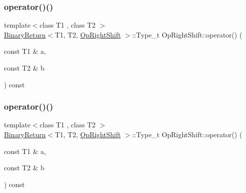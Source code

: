 \subsubsection{\texorpdfstring{operator()()}{operator()()}\hspace{0.1cm}{\footnotesize\ttfamily [1/3]}}
{\footnotesize\ttfamily template$<$class T1 , class T2 $>$ \\
\mbox{\hyperlink{structBinaryReturn}{Binary\+Return}}$<$T1, T2, \mbox{\hyperlink{structOpRightShift}{Op\+Right\+Shift}} $>$\+::Type\+\_\+t Op\+Right\+Shift\+::operator() (\begin{DoxyParamCaption}\item[{const T1 \&}]{a,  }\item[{const T2 \&}]{b }\end{DoxyParamCaption}) const\hspace{0.3cm}{\ttfamily [inline]}}

\mbox{\label{structOpRightShift_a8b6b10211df9e2bcb0e8ce90458f12b8}} 
\subsubsection{\texorpdfstring{operator()()}{operator()()}\hspace{0.1cm}{\footnotesize\ttfamily [2/3]}}
{\footnotesize\ttfamily template$<$class T1 , class T2 $>$ \\
\mbox{\hyperlink{structBinaryReturn}{Binary\+Return}}$<$T1, T2, \mbox{\hyperlink{structOpRightShift}{Op\+Right\+Shift}} $>$\+::Type\+\_\+t Op\+Right\+Shift\+::operator() (\begin{DoxyParamCaption}\item[{const T1 \&}]{a,  }\item[{const T2 \&}]{b }\end{DoxyParamCaption}) const\hspace{0.3cm}{\ttfamily [inline]}}

\mbox{\label{structOpRightShift_a8b6b10211df9e2bcb0e8ce90458f12b8}} 
